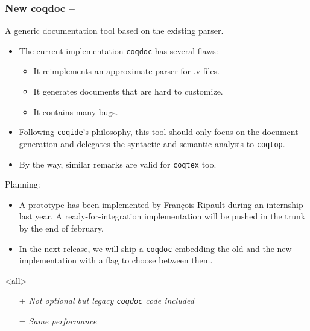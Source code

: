 \begin{frame}[fragile]
\frametitle{New coqdoc -- }

  \begin{center}
    A generic documentation tool based on the existing \Coq parser.
  \end{center}
  \begin{itemize}
  \item The current implementation \texttt{coqdoc} has several flaws:
    \begin{itemize}
    \item It reimplements an approximate parser for .v files.
    \item It generates documents that are hard to customize.
    \item It contains many bugs.
    \end{itemize}
  \item Following \texttt{coqide}'s philosophy, this tool should
    only focus on the document generation and delegates the syntactic
    and semantic analysis to \texttt{coqtop}.
    
  \item By the way, similar remarks are valid for \texttt{coqtex} too.
  \end{itemize}

  Planning:
  \begin{itemize}
  \item A prototype has been implemented by Fran\c{c}ois Ripault during an
    internship last year. A ready-for-integration implementation will
    be pushed in the trunk by the end of february.
  \item In the next release, we will ship a \verb!coqdoc! embedding
    the old and the new implementation with a flag to choose between
    them.
  \end{itemize}
  \mode<all>

  \begin{itemize}
  \item[+] \emph{Not optional but legacy \texttt{coqdoc} code included}
  \item[=] \emph{Same performance}
  \end{itemize}
  
\end{frame}

